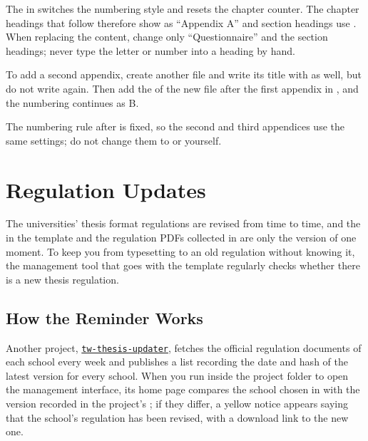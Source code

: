 The \code{\appendix} in  switches the numbering style and resets the chapter counter. The chapter headings that follow therefore show as ``Appendix A'' and section headings use . When replacing the content, change only ``Questionnaire'' and the section headings; never type the letter or number into a heading by hand.

To add a second appendix, create another  file and write its title with \code{\chapter} as well, but do not write \code{\appendix} again. Then add the \code{} of the new file after the first appendix in , and the numbering continues as B.

The numbering rule after \code{\appendix} is fixed, so the second and third appendices use the same settings; do not change them to  or  yourself.

\section{Regulation Updates}

The universities' thesis format regulations are revised from time to time, and the  in the template and the regulation PDFs collected in  are only the version of one moment. To keep you from typesetting to an old regulation without knowing it, the management tool  that goes with the template regularly checks whether there is a new thesis regulation.

\subsection{How the Reminder Works}

Another project, \href{https://github.com/TW-Thesis/tw-thesis-updater}{\texttt{tw-thesis-updater}}, fetches the official regulation documents of each school every week and publishes a list recording the date and hash of the latest version for every school. When you run  inside the project folder to open the management interface, its home page compares the school chosen in  with the version recorded in the project's ; if they differ, a yellow notice appears saying that the school's regulation has been revised, with a download link to the new one.

